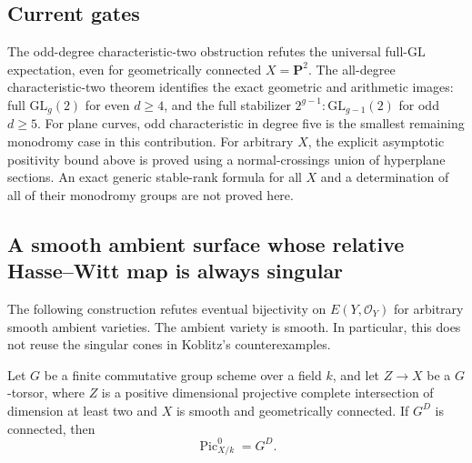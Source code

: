 \subsection{Current gates}
The odd-degree characteristic-two obstruction refutes the universal
full-$\mathrm{GL}$ expectation, even for geometrically connected
$X=\mathbf P^2$.  The all-degree characteristic-two theorem identifies
the exact geometric and arithmetic images: full $\mathrm{GL}_g(2)$
for even $d\ge4$, and the full stabilizer
$2^{g-1}\!:\mathrm{GL}_{g-1}(2)$ for odd $d\ge5$.
For plane curves, odd characteristic in degree five is the smallest
remaining monodromy case in this contribution.
For arbitrary $X$, the explicit asymptotic positivity bound above is
proved using a normal-crossings union of hyperplane sections.
An exact generic stable-rank formula for all $X$ and a determination
of all of their monodromy groups are not proved here.

\subsection{A smooth ambient surface whose relative Hasse--Witt map is always singular}
\label{subsec:relative-ordinarity-counterexample}

The following construction refutes eventual bijectivity on
$E(Y,\mathcal O_Y)$ for arbitrary smooth ambient varieties.  The
ambient variety is smooth.  In particular, this does not reuse the
singular cones in Koblitz's counterexamples.

\begin{lemma}\label{lem:picard-finite-quotient}
Let $G$ be a finite commutative group scheme over a field $k$, and
let $Z\to X$ be a $G$-torsor, where $Z$ is a positive dimensional
projective complete intersection of dimension at least two and $X$
is smooth and geometrically connected.  If $G^D$ is connected, then
\[
 \operatorname{Pic}_{X/k}^0=G^D.
\]
\end{lemma}

